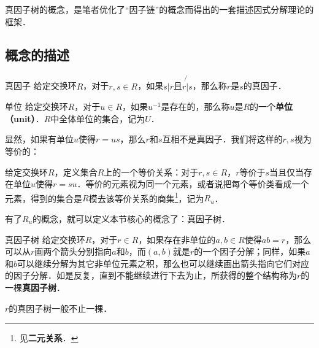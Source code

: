 
真因子树的概念，是笔者优化了“因子链”的概念而得出的一套描述因式分解理论的框架．

\subsection{概念的描述}

\begin{definition}{真因子}
给定交换环$R$，对于$r, s\in R$，如果$s|r$且$r\not{|}s$，那么称$r$是$s$的真因子．
\end{definition}

\begin{definition}{单位}
给定交换环$R$，对于$u\in R$，如果$u^{-1}$是存在的，那么称$u$是$R$的一个\textbf{单位（unit）}．$R$中全体单位的集合，记为$U$．
\end{definition}

显然，如果有单位$u$使得$r=us$，那么$r$和$s$互相不是真因子．我们将这样的$r, s$视为等价的：

\begin{definition}{}
给定交换环$R$，定义集合$R$上的一个等价关系：对于$r, s\in R$，$r$等价于$s$当且仅当存在单位$u$使得$r=su$．等价的元素视为同一个元素，或者说把每个等价类看成一个元素，得到的集合是$R$模去该等价关系的商集\footnote{见\textbf{二元关系}．}，记为$R_u$．
\end{definition}

有了$R_u$的概念，就可以定义本节核心的概念了：真因子树．

\begin{definition}{真因子树}
给定交换环$R$，对于$r\in R$，如果存在非单位的$a, b\in R$使得$ab=r$，那么可以从$r$画两个箭头分别指向$a$和$b$，而$(a, b)$就是$r$的一个因子分解；同样，如果$a$和$b$可以继续分解为其它非单位元素之积，那么也可以继续画出箭头指向它们对应的因子分解．如是反复，直到不能继续进行下去为止，所获得的整个结构称为$r$的一棵\textbf{真因子树}．

$r$的真因子树一般不止一棵．
\end{definition}




